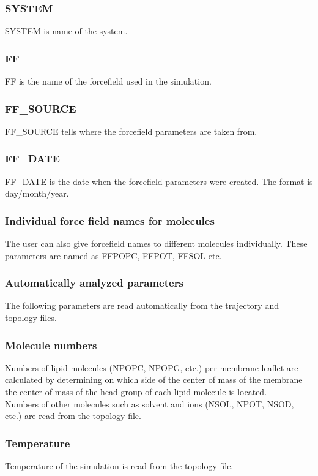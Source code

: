 \documentclass[fleqn,10pt]{wlscirep}
\begin{document}
\subsubsection*{SYSTEM}
SYSTEM is name of the system.
\subsubsection*{FF}
FF is the name of the forcefield used in the simulation.
\subsubsection*{FF\_SOURCE}
FF\_SOURCE tells where the forcefield parameters are taken from.
\subsubsection*{FF\_DATE}
FF\_DATE is the date when the forcefield parameters were created. The format is day/month/year.
\subsubsection*{Individual force field names for molecules}
The user can also give forcefield names to different molecules individually. These parameters are named as FFPOPC, FFPOT, FFSOL etc.


\subsubsection{Automatically analyzed parameters}
The following parameters are read automatically from the trajectory and topology files.
\subsubsection*{Molecule numbers}
Numbers of lipid molecules (NPOPC, NPOPG, etc.) per membrane leaflet are calculated by determining on which side of the center of mass of the membrane the center of mass of the head group of each lipid molecule is located.
\newline \\
\noindent Numbers of other molecules such as solvent and ions (NSOL, NPOT, NSOD, etc.) are read from the topology file.

\subsubsection*{Temperature}
Temperature of the simulation is read from the topology file.
\end{document}
